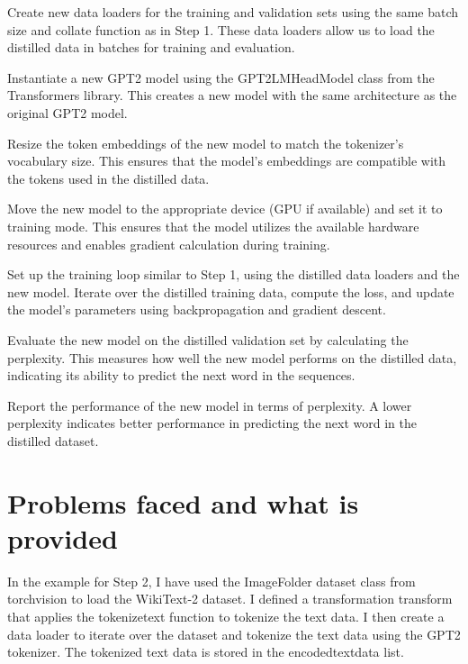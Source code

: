 \documentclass{article}
\begin{document}
\medskip

Create new data loaders for the training and validation sets using the same batch size and collate function as in Step 1. These data loaders allow us to load the distilled data in batches for training and evaluation.

\medskip

Instantiate a new GPT2 model using the GPT2LMHeadModel class from the Transformers library. This creates a new model with the same architecture as the original GPT2 model.

\medskip

Resize the token embeddings of the new model to match the tokenizer's vocabulary size. This ensures that the model's embeddings are compatible with the tokens used in the distilled data.

\medskip

Move the new model to the appropriate device (GPU if available) and set it to training mode. This ensures that the model utilizes the available hardware resources and enables gradient calculation during training.

\medskip

Set up the training loop similar to Step 1, using the distilled data loaders and the new model. Iterate over the distilled training data, compute the loss, and update the model's parameters using backpropagation and gradient descent.

\medskip

Evaluate the new model on the distilled validation set by calculating the perplexity. This measures how well the new model performs on the distilled data, indicating its ability to predict the next word in the sequences.

\medskip

Report the performance of the new model in terms of perplexity. A lower perplexity indicates better performance in predicting the next word in the distilled dataset.


\section*{Problems faced and what is provided}
\label{heading}
In the example for Step 2, I have used the ImageFolder dataset class from torchvision to load the WikiText-2 dataset. I defined a transformation transform that applies the tokenize\textunderscore text function to tokenize the text data. I then create a data loader to iterate over the dataset and tokenize the text data using the GPT2 tokenizer. The tokenized text data is stored in the encoded\textunderscore text\textunderscore data list.
\end{document}
